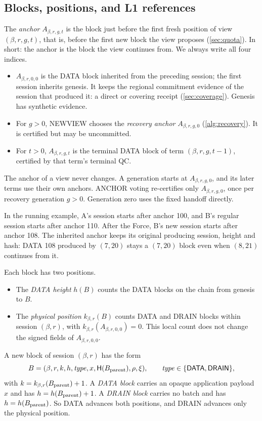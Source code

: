 \documentclass[11pt,a4paper]{article}
\newcommand{\Hash}{\mathsf H}
\newcommand{\tagg}[1]{\ensuremath{\mathsf{#1}}}
\newcommand{\defterm}[1]{\textcolor{rrBlue}{\textit{#1}}}
\begin{document}
\subsection{Blocks, positions, and L1 references}
\label{sec:blocks}
The \defterm{anchor} $A_{\beta,r,g,t}$ is the block just before the first
fresh position of view $(\beta,r,g,t)$, that is, before the first new
block the view proposes (\cref{sec:quota}). In short: the anchor is the
block the view continues from. We always write all four indices.
\begin{itemize}
\item $A_{\beta,r,0,0}$ is the DATA block inherited from the preceding
session; the first session inherits genesis. It keeps the regional
commitment evidence of the session that produced it: a direct or
covering receipt (\cref{sec:coverage}). Genesis has synthetic evidence.
\item For $g>0$, NEWVIEW chooses the \defterm{recovery anchor}
$A_{\beta,r,g,0}$ (\cref{alg:recovery}). It is certified but may be
uncommitted.
\item For $t>0$, $A_{\beta,r,g,t}$ is the terminal DATA block of term
$(\beta,r,g,t-1)$, certified by that term's terminal QC.
\end{itemize}
The anchor of a view never changes. A generation starts at
$A_{\beta,r,g,0}$, and its later terms use their own anchors. ANCHOR
voting re-certifies only $A_{\beta,r,g,0}$, once per recovery
generation $g>0$. Generation zero uses the fixed handoff directly.

In the running example, A's session starts after anchor 100, and B's
regular session starts after anchor 110. After the Force, B's new session
starts after anchor 108. The inherited anchor keeps its original
producing session, height and hash: DATA 108 produced by $(7,20)$ stays
a $(7,20)$ block even when $(8,21)$ continues from it.

Each block has two positions.
\begin{itemize}
\item The \defterm{DATA height} $h(B)$ counts the DATA blocks on the chain
from genesis to $B$.
\item The \defterm{physical position} $k_{\beta,r}(B)$ counts DATA and DRAIN
blocks within session $(\beta,r)$, with $k_{\beta,r}(A_{\beta,r,0,0})=0$.
This local count does not change the signed fields of $A_{\beta,r,0,0}$.
\end{itemize}
A new block of session $(\beta,r)$ has the form
\[
 B=(\beta,r,k,h,\mathit{type},x,\Hash(B_{\rm parent}),\rho,\xi),
 \qquad \mathit{type}\in\{\tagg{DATA},\tagg{DRAIN}\},
\]
with $k=k_{\beta,r}(B_{\rm parent})+1$. A \defterm{DATA block} carries an opaque application payload
$x$ and has $h=h(B_{\rm parent})+1$. A \defterm{DRAIN
block} carries no batch and has $h=h(B_{\rm parent})$. So DATA advances
both positions, and DRAIN advances only the physical position.
\end{document}
